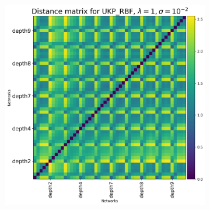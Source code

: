 \documentclass{article}
\theoremstyle{plain}
\begin{document}
\begin{figure}[!h]
\begin{subfigure}[b]{0.3\textwidth}
    \end{subfigure}
    \hfill
    \begin{subfigure}[b]{0.3\textwidth}
        \includegraphics[width=\textwidth]{Appendix figures/mnist_experiments/Heatmaps/Heatmap for UKP_dist_RBF_1.000000e+00_1.000000e-02.png}
    \end{subfigure}
    
    \vspace{0.5cm}  %
    

\end{figure}
\end{document}
